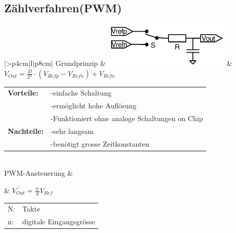 \subsection{Zählverfahren(PWM)}
\begin{longtable}{|>{\bfseries}p{4cm}|l|p{8cm}|}
	\hline 
	Grundprinzip \hartl{466}
	& \includegraphics[width=6cm, valign=t]{./pictures/pwm_DAC.png}
	& $ V_{Out}=\frac{D}{2^n} \cdot (V_{Refp}-V_{Refn})+V_{Refn} $ \newline
	\begin{tabular}{lp{5cm}}
    \textbf{Vorteile:} 
      &-einfache Schaltung \\
      &-ermöglicht hohe Auflösung \\
      &-Funktioniert ohne analoge Schaltungen on Chip \\
    
    \textbf{Nachteile:}
      &-sehr langsam \\
      &-benötigt grosse Zeitkonstanten 
  \end{tabular}
	\\ \hline
	PWM-Ansteuerung 
	& \parbox[c][2cm]{6cm}{}
	& $\bar{V_{Out}}=\frac{n}{N}V_{Ref}$
	  \begin{tabular}{ll}
		N:&Takte\\
		n:&digitale Eingangsgrösse
	  \end{tabular}
	\\ \hline
\end{longtable}

\newpage


